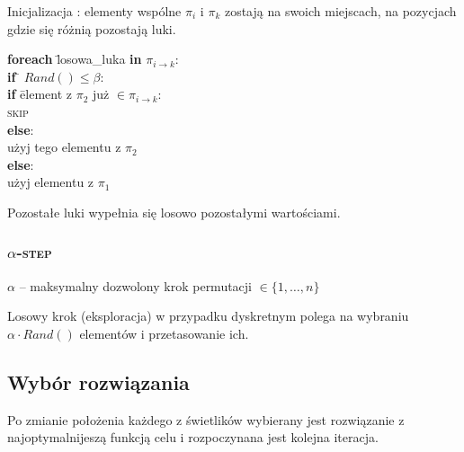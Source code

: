 \documentclass[12pt]{article}
\begin{document}
\flushleft
Inicjalizacja :
 elementy wspólne $\pi_i$ i $\pi_k$ zostają na swoich miejscach, 
 na pozycjach gdzie się różnią pozostają luki. 
\begin{tabbing}
\textbf{foreach} \= losowa\_luka \textbf{in} $\pi_{i\rightarrow k}$:\\ 
\> \textbf{if} \= $Rand() \leqslant \beta$: \\
\> \> \textbf{if} \= element z $\pi_2$ już $\in \pi_{i\rightarrow k}$: \\
\> \> \> \textsc{skip} \\
\> \> \textbf{else}:\= \\
\> \> \>  użyj tego elementu z $\pi_2$ \\
\> \textbf{else}: \= \\
\> \> użyj elementu z $\pi_1$

\end{tabbing}
Pozostałe luki wypełnia się losowo pozostałymi wartościami.

\subsubsection{\textsc{$\alpha$-step}}

\begin{description}
 \item $\alpha$ -- maksymalny dozwolony krok permutacji $\in \{ 1, \dots , n \}$
\end{description}
Losowy krok (eksploracja) w przypadku dyskretnym polega na wybraniu $\alpha \cdot Rand()$ elementów i przetasowanie ich.

\subsection{Wybór rozwiązania}
Po zmianie położenia każdego z świetlików wybierany jest rozwiązanie z najoptymalnijeszą funkcją celu i rozpoczynana jest kolejna iteracja.



 
\end{document}
